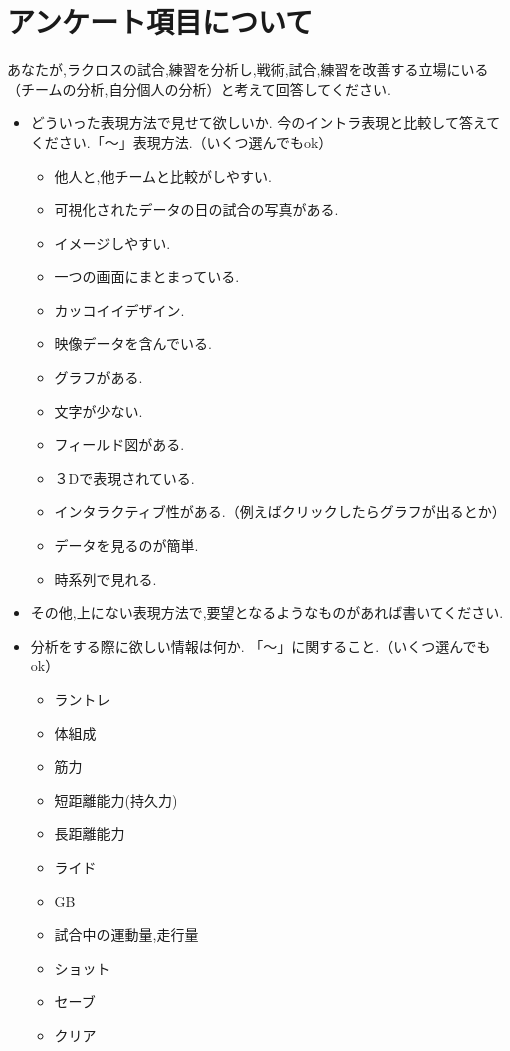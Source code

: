 \documentclass[sotsuron]{kuee}
\begin{document}
\chapter{アンケート項目について}
	あなたが,ラクロスの試合,練習を分析し,戦術,試合,練習を改善する立場にいる（チームの分析,自分個人の分析）と考えて回答してください.
	\begin{itemize}
		\item どういった表現方法で見せて欲しいか.
			今のイントラ表現と比較して答えてください.「〜」表現方法.（いくつ選んでもok）
			\begin{itemize}
				\item 他人と,他チームと比較がしやすい.
				\item 可視化されたデータの日の試合の写真がある.
				\item イメージしやすい.
				\item 一つの画面にまとまっている.
				\item カッコイイデザイン.
				\item 映像データを含んでいる.
				\item グラフがある.
				\item 文字が少ない.
				\item フィールド図がある.
				\item ３Dで表現されている.
				\item インタラクティブ性がある.（例えばクリックしたらグラフが出るとか）
				\item データを見るのが簡単.
				\item 時系列で見れる.
			\end{itemize}
		\item その他,上にない表現方法で,要望となるようなものがあれば書いてください.
		\item 分析をする際に欲しい情報は何か.
			「〜」に関すること.（いくつ選んでもok）
			\begin{itemize}
				\item ラントレ
				\item 体組成
				\item 筋力
				\item 短距離能力(持久力)
				\item 長距離能力
				\item ライド
				\item GB
				\item 試合中の運動量,走行量
				\item ショット
				\item セーブ
				\item クリア

\end{itemize}
\end{itemize}
\end{document}
